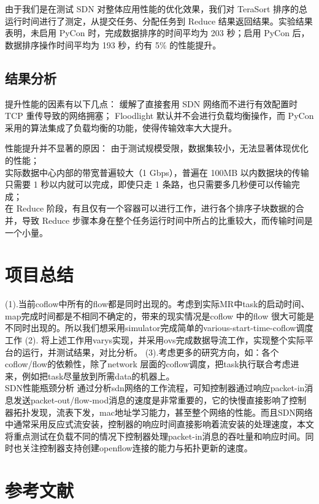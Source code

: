 \documentclass[a4paper, 11pt]{article}                                                   %
\begin{document}
\begin{CJK*}{UTF8}{song}
由于我们是在测试 SDN 对整体应用性能的优化效果，我们对 TeraSort 排序的总运行时间进行了测定，从提交任务、分配任务到 Reduce 结果返回结果。实验结果表明，未启用 PyCon 时，完成数据排序的时间平均为 203 秒；启用 PyCon 后，数据排序操作时间平均为 193 秒，约有 5\% 的性能提升。

\subsection{结果分析}
提升性能的因素有以下几点：
缓解了直接套用 SDN 网络而不进行有效配置时 TCP 重传导致的网络拥塞；
Floodlight 默认并不会进行负载均衡操作，而 PyCon 采用的算法集成了负载均衡的功能，使得传输效率大大提升。

性能提升并不显著的原因：
由于测试规模受限，数据集较小，无法显著体现优化的性能；\\
实际数据中心内部的带宽普遍较大（1 Gbps），普遍在 100MB 以内数据块的传输只需要 1 秒以内就可以完成，即使只走 1 条路，也只需要多几秒便可以传输完成；\\
在 Reduce 阶段，有且仅有一个容器可以进行工作，进行各个排序子块数据的合并，导致 Reduce 步骤本身在整个任务运行时间中所占的比重较大，而传输时间是一个小量。

\section{项目总结}
(1).当前coflow中所有的flow都是同时出现的。考虑到实际MR中task的启动时间、map完成时间都是不相同不确定的，带来的现实情况是coflow 中的flow 很大可能是不同时出现的。所以我们想采用simulator完成简单的various-start-time-coflow调度工作
(2). 将上述工作用varys实现，并采用ovs完成数据导流工作，实现整个实际平台的运行，并测试结果，对比分析。
(3).考虑更多的研究方向，如：各个coflow/flow的依赖性，除了network 层面的coflow调度，把task执行联合考虑进来，例如把task尽量放到所需data的机器上。\\
SDN性能瓶颈分析
通过分析sdn网络的工作流程，可知控制器通过响应packet-in消息发送packet-out/flow-mod消息的速度是非常重要的，它的快慢直接影响了控制器拓扑发现，流表下发，mac地址学习能力，甚至整个网络的性能。而且SDN网络中通常采用反应式流安装，控制器的响应时间直接影响着流安装的处理速度，本文将重点测试在负载不同的情况下控制器处理packet-in消息的吞吐量和响应时间。同时也关注控制器支持创建openflow连接的能力与拓扑更新的速度。
\section{参考文献}


\end{CJK*}
\end{document}
